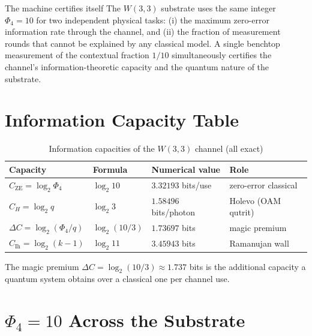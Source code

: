 \documentclass[11pt]{article}
\begin{document}
\begin{keybox}{The machine certifies itself}
The $W(3,3)$ substrate uses the same integer $\Phi_4 = 10$ for two independent
physical tasks: (i) the maximum zero-error information rate through the channel,
and (ii) the fraction of measurement rounds that cannot be explained by any classical
model. A single benchtop measurement of the contextual fraction $1/10$ simultaneously
certifies the channel's information-theoretic capacity and the quantum nature of
the substrate.
\end{keybox}

\section{Information Capacity Table}

\begin{table}[h]
\centering
\caption{Information capacities of the $W(3,3)$ channel (all exact)}
\begin{tabular}{llll}
\toprule
Capacity & Formula & Numerical value & Role \\
\midrule
$C_{\mathrm{ZE}} = \log_2\Phi_4$ & $\log_2 10$ & $3.32193$ bits/use & zero-error classical \\
$C_H = \log_2 q$ & $\log_2 3$ & $1.58496$ bits/photon & Holevo (OAM qutrit) \\
$\Delta C = \log_2(\Phi_4/q)$ & $\log_2(10/3)$ & $1.73697$ bits & magic premium \\
$C_{\mathrm{Ih}} = \log_2(k{-}1)$ & $\log_2 11$ & $3.45943$ bits & Ramanujan wall \\
\bottomrule
\end{tabular}
\end{table}

The magic premium $\Delta C = \log_2(10/3) \approx 1.737$ bits is the additional
capacity a quantum system obtains over a classical one per channel use.

\section{$\Phi_4 = 10$ Across the Substrate}
\end{document}
